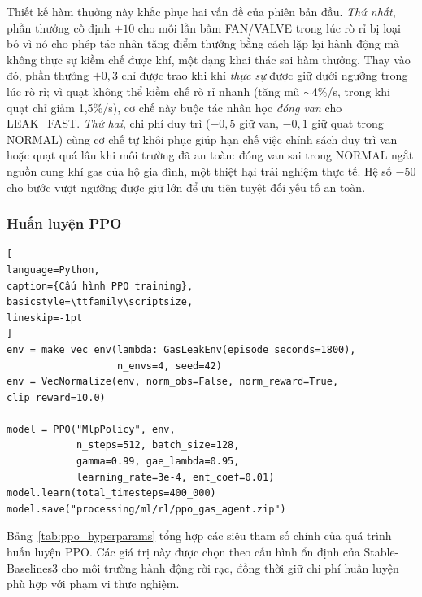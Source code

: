 Thiết kế hàm thưởng này khắc phục hai vấn đề của phiên bản đầu. \emph{Thứ nhất}, phần thưởng cố định $+10$ cho mỗi lần bấm FAN/VALVE trong lúc rò rỉ bị loại bỏ vì nó cho phép tác nhân tăng điểm thưởng bằng cách lặp lại hành động mà không thực sự kiềm chế được khí, một dạng khai thác sai hàm thưởng. Thay vào đó, phần thưởng $+0{,}3$ chỉ được trao khi khí \emph{thực sự} được giữ dưới ngưỡng trong lúc rò rỉ; vì quạt không thể kiềm chế rò rỉ nhanh (tăng mũ $\sim$4\%/s, trong khi quạt chỉ giảm 1{,}5\%/s), cơ chế này buộc tác nhân học \emph{đóng van} cho LEAK\_FAST. \emph{Thứ hai}, chi phí duy trì ($-0{,}5$ giữ van, $-0{,}1$ giữ quạt trong NORMAL) cùng cơ chế tự khôi phục giúp hạn chế việc chính sách duy trì van hoặc quạt quá lâu khi môi trường đã an toàn: đóng van sai trong NORMAL ngắt nguồn cung khí gas của hộ gia đình, một thiệt hại trải nghiệm thực tế. Hệ số $-50$ cho bước vượt ngưỡng được giữ lớn để ưu tiên tuyệt đối yếu tố an toàn.

\subsubsection*{Huấn luyện PPO}

\Needspace{0.45\textheight}
\begin{lstlisting}[
language=Python,
caption={Cấu hình PPO training},
basicstyle=\ttfamily\scriptsize,
lineskip=-1pt
]
env = make_vec_env(lambda: GasLeakEnv(episode_seconds=1800),
                   n_envs=4, seed=42)
env = VecNormalize(env, norm_obs=False, norm_reward=True, clip_reward=10.0)

model = PPO("MlpPolicy", env,
            n_steps=512, batch_size=128,
            gamma=0.99, gae_lambda=0.95,
            learning_rate=3e-4, ent_coef=0.01)
model.learn(total_timesteps=400_000)
model.save("processing/ml/rl/ppo_gas_agent.zip")
\end{lstlisting}

Bảng~\ref{tab:ppo_hyperparams} tổng hợp các siêu tham số chính của quá trình huấn luyện PPO. Các giá trị này được chọn theo cấu hình ổn định của Stable-Baselines3 cho môi trường hành động rời rạc, đồng thời giữ chi phí huấn luyện phù hợp với phạm vi thực nghiệm.

\begingroup
\small
\renewcommand{\arraystretch}{1.25}
\setlength{\tabcolsep}{4pt}

